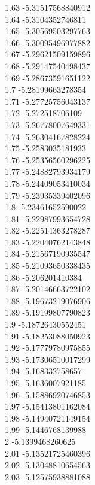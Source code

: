 {1.63	-5.31517568840912\\
1.64	-5.3104352746811\\
1.65	-5.30569503297763\\
1.66	-5.30095496977882\\
1.67	-5.29621509159896\\
1.68	-5.29147540498437\\
1.69	-5.28673591651122\\
1.7	-5.28199663278354\\
1.71	-5.27725756043137\\
1.72	-5.272518706109\\
1.73	-5.26778007649331\\
1.74	-5.26304167828224\\
1.75	-5.2583035181933\\
1.76	-5.25356560296225\\
1.77	-5.24882793934179\\
1.78	-5.24409053410034\\
1.79	-5.23935339402096\\
1.8	-5.23461652590022\\
1.81	-5.22987993654728\\
1.82	-5.22514363278287\\
1.83	-5.22040762143848\\
1.84	-5.21567190935547\\
1.85	-5.21093650338435\\
1.86	-5.206201410384\\
1.87	-5.20146663722102\\
1.88	-5.19673219076906\\
1.89	-5.19199807790823\\
1.9	-5.18726430552451\\
1.91	-5.18253088050923\\
1.92	-5.17779780975855\\
1.93	-5.17306510017299\\
1.94	-5.168332758657\\
1.95	-5.1636007921185\\
1.96	-5.15886920746853\\
1.97	-5.15413801162084\\
1.98	-5.14940721149154\\
1.99	-5.1446768139988\\
2	-5.1399468260625\\
2.01	-5.13521725460396\\
2.02	-5.13048810654563\\
2.03	-5.12575938881088\\
}
